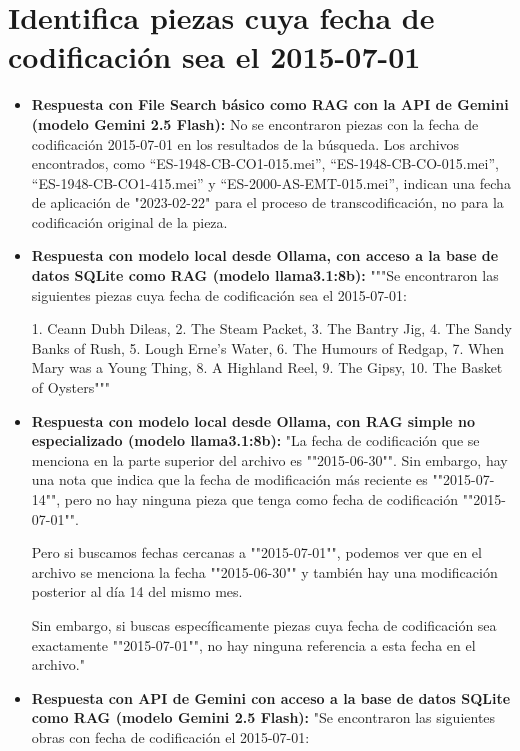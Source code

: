 \section{Identifica piezas cuya fecha de codificación sea el 2015-07-01}
\begin{itemize}
    \item \textbf{Respuesta con File Search básico como RAG con la API de Gemini (modelo Gemini 2.5 Flash):} No se encontraron piezas con la fecha de codificación 2015-07-01 en los resultados de la búsqueda. Los archivos encontrados, como ``ES-1948-CB-CO1-015.mei'', ``ES-1948-CB-CO-015.mei'', ``ES-1948-CB-CO1-415.mei'' y ``ES-2000-AS-EMT-015.mei'', indican una fecha de aplicación de "2023-02-22" para el proceso de transcodificación, no para la codificación original de la pieza.
    \item \textbf{Respuesta con modelo local desde Ollama, con acceso a la base de datos SQLite como RAG (modelo llama3.1:8b):} """Se encontraron las siguientes piezas cuya fecha de codificación sea el 2015-07-01:

1. Ceann Dubh Dileas,
2. The Steam Packet,
3. The Bantry Jig,
4. The Sandy Banks of Rush,
5. Lough Erne’s Water,
6. The Humours of Redgap,
7. When Mary was a Young Thing,
8. A Highland Reel,
9. The Gipsy,
10. The Basket of Oysters"""
\item \textbf{Respuesta con modelo local desde Ollama, con RAG simple no especializado (modelo llama3.1:8b):} "La fecha de codificación que se menciona en la parte superior del archivo es ""2015-06-30"". Sin embargo, hay una nota que indica que la fecha de modificación más reciente es ""2015-07-14"", pero no hay ninguna pieza que tenga como fecha de codificación ""2015-07-01"".

Pero si buscamos fechas cercanas a ""2015-07-01"", podemos ver que en el archivo se menciona la fecha ""2015-06-30"" y también hay una modificación posterior al día 14 del mismo mes.

Sin embargo, si buscas específicamente piezas cuya fecha de codificación sea exactamente ""2015-07-01"", no hay ninguna referencia a esta fecha en el archivo."
\item \textbf{Respuesta con API de Gemini con acceso a la base de datos SQLite como RAG (modelo Gemini 2.5 Flash):} "Se encontraron las siguientes obras con fecha de codificación el 2015-07-01:


\end{itemize}
